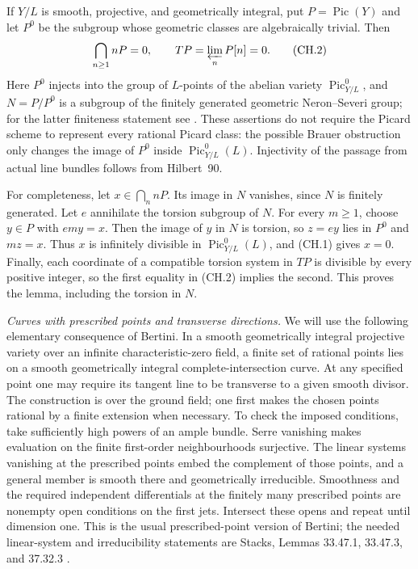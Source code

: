 If $Y/L$ is smooth, projective, and geometrically integral, put
$P=\operatorname{Pic}(Y)$ and let $P^0$ be the subgroup whose geometric
classes are algebraically trivial. Then
\[
                 \bigcap_{n\geq1}nP=0,
                 \qquad T P=\varprojlim_n P[n]=0.         \tag{CH.2}
\]
Here $P^0$ injects into the group of $L$-points of the abelian variety
$\operatorname{Pic}^0_{Y/L}$, and
$N=P/P^0$ is a subgroup of the finitely generated geometric
Neron--Severi group; for the latter finiteness statement see
\cite[Theorem~7.3 and Lemma~7.2]{FA_ChengEtAl2021}.
These assertions do not require the Picard scheme
to represent every rational Picard class: the possible Brauer
obstruction only changes the image of $P^0$ inside
$\operatorname{Pic}^0_{Y/L}(L)$. Injectivity of the passage from actual
line bundles follows from Hilbert~90.

For completeness, let $x\in\bigcap_n nP$. Its image in $N$ vanishes,
since $N$ is finitely generated. Let $e$ annihilate the torsion subgroup
of $N$. For every $m\geq1$, choose $y\in P$ with $em y=x$.
Then the image of $y$ in $N$ is torsion, so $z=ey$ lies in $P^0$ and
$mz=x$. Thus $x$ is infinitely divisible in
$\operatorname{Pic}^0_{Y/L}(L)$, and (CH.1) gives $x=0$. Finally, each
coordinate of a compatible torsion system in $T P$ is divisible by
every positive integer, so the first equality in (CH.2) implies the
second. This proves the lemma, including the torsion in $N$.

\emph{Curves with prescribed points and transverse directions.}
We will use the following elementary consequence of Bertini. In a
smooth geometrically integral projective variety over an infinite
characteristic-zero field, a finite set of rational points lies on a
smooth geometrically integral complete-intersection curve. At any
specified point one may require its tangent line to be transverse to
a given smooth divisor. The construction is over the ground field;
one first makes the chosen points rational by a finite extension when
necessary. To check the imposed conditions, take sufficiently high
powers of an ample bundle. Serre vanishing makes evaluation on the
finite first-order neighbourhoods surjective. The linear systems
vanishing at the prescribed points embed the complement of those
points, and a general member is smooth there and geometrically
irreducible. Smoothness and the required independent differentials at
the finitely many prescribed points are nonempty open conditions on
the first jets. Intersect these opens and repeat until dimension one.
This is the usual prescribed-point version of Bertini; the needed
linear-system and irreducibility statements are Stacks, Lemmas
33.47.1, 33.47.3, and 37.32.3 \cite{FA_StacksBertini}.

